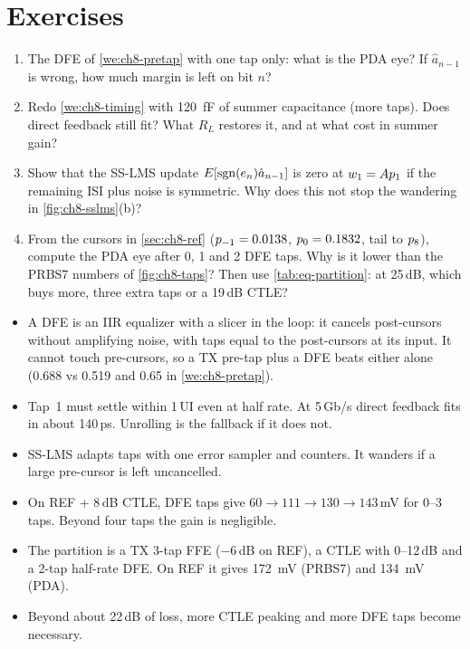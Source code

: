 \section*{Exercises}
\begin{enumerate}[label=\textbf{8.\arabic*}, leftmargin=2.2em]
  \item The DFE of \cref{we:ch8-pretap} with one tap only: what is the PDA eye? If $\hat a_{n-1}$ is wrong, how much margin is left on bit $n$?
  \item Redo \cref{we:ch8-timing} with \qty{120}{\femto\farad} of summer capacitance (more taps). Does direct feedback still fit? What $R_L$ restores it, and at what cost in summer gain?
  \item Show that the SS-LMS update $E[\operatorname{sgn}(e_n)\hat a_{n-1}]$ is zero at $w_1=Ap_{1}$ if the remaining ISI plus noise is symmetric. Why does this not stop the wandering in \cref{fig:ch8-sslms}(b)?
  \item From the cursors in \cref{sec:ch8-ref} ($p_{-1}=0.0138$, $p_{0}=0.1832$, tail to $p_{8}$), compute the PDA eye after 0, 1 and 2 DFE taps. Why is it lower than the PRBS7 numbers of \cref{fig:ch8-taps}? Then use \cref{tab:eq-partition}: at 25\,dB, which buys more, three extra taps or a 19\,dB CTLE?
\end{enumerate}

\begin{takeaways}
\begin{itemize}
  \item A DFE is an IIR equalizer with a slicer in the loop: it cancels post-cursors without amplifying noise, with taps equal to the post-cursors at its input. It cannot touch pre-cursors, so a TX pre-tap plus a DFE beats either alone (0.688 vs 0.519 and 0.65 in \cref{we:ch8-pretap}).
  \item Tap~1 must settle within 1\,UI even at half rate. At 5\,Gb/s direct feedback fits in about 140\,ps. Unrolling is the fallback if it does not.
  \item SS-LMS adapts taps with one error sampler and counters. It wanders if a large pre-cursor is left uncancelled.
  \item On REF + 8\,dB CTLE, DFE taps give $60\to111\to130\to143$\,mV for 0--3 taps. Beyond four taps the gain is negligible.
  \item The \OS{} partition is a TX 3-tap FFE ($-6$\,dB on REF), a CTLE with 0--12\,dB and a 2-tap half-rate DFE. On REF it gives \qty{172}{\milli\volt} (PRBS7) and \qty{134}{\milli\volt} (PDA).
  \item Beyond about 22\,dB of loss, more CTLE peaking and more DFE taps become necessary.
\end{itemize}
\end{takeaways}
